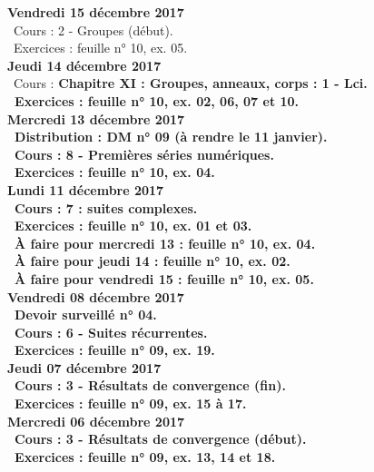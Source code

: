 \documentclass[12pt,a4paper]{article}
\begin{document}
\noindent\textbf{Vendredi 15 décembre 2017}\\
\bu\ Cours : 2 - Groupes (début).\\ 
\bu\ Exercices : feuille n° 10, ex. 05.\vspace{.4cm}\\

\noindent\textbf{Jeudi 14 décembre 2017}\\
\bu\ Cours : \bf Chapitre XI \rm : Groupes, anneaux, corps  : 1 - Lci.\\
\bu\ Exercices : feuille n° 10, ex. 02, 06, 07 et 10.\vspace{.4cm}\\

\noindent\textbf{\bf Mercredi 13 décembre 2017}\\
\bu\ Distribution : DM n° 09 (à rendre le 11 janvier).\\
\bu\ Cours : 8 - Premières séries numériques.\\
\bu\ Exercices : feuille n° 10, ex. 04.\vspace{.4cm}\\

\noindent\textbf{Lundi 11 décembre 2017}\\
\bu\ Cours : 7 : suites complexes.\\
\bu\ Exercices : feuille n° 10, ex. 01 et 03.\\
\bu\ À faire pour mercredi 13 : feuille n° 10, ex. 04.\\
\bu\ À faire pour jeudi 14 : feuille n° 10, ex. 02.\\
\bu\ À faire pour vendredi 15 : feuille n° 10, ex. 05.\vspace{.4cm}\\

\noindent\textbf{Vendredi 08 décembre 2017}\\
\bu\ Devoir surveillé n° 04.\\
\bu\ Cours : 6 - Suites récurrentes.\\
\bu\ Exercices : feuille n° 09, ex. 19.\vspace{.4cm}\\

\noindent\textbf{Jeudi 07 décembre 2017}\\
\bu\ Cours : 3 - Résultats de convergence (fin).\\
\bu\ Exercices : feuille n° 09, ex. 15 à 17.\vspace{.4cm}\\

\noindent\textbf{\bf Mercredi 06 décembre 2017}\\
\bu\ Cours : 3 - Résultats de convergence (début).\\
\bu\ Exercices : feuille n° 09, ex. 13, 14 et 18.\vspace{.4cm}\\
\end{document}
